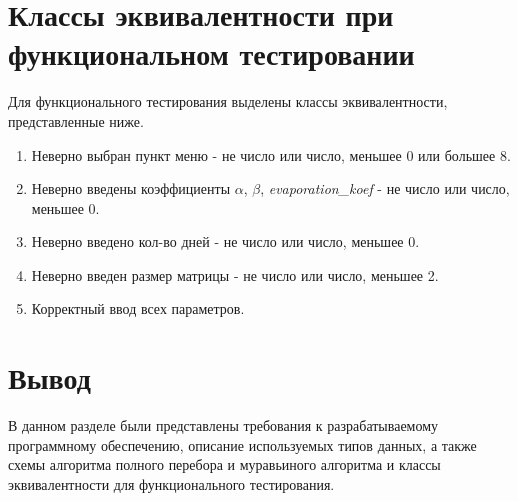 
\clearpage

\section{Классы эквивалентности при функциональном тестировании}

Для функционального тестирования выделены классы эквивалентности, представленные ниже.

\begin{enumerate}
	\item Неверно выбран пункт меню - не число или число, меньшее 0 или большее 8.
	\item Неверно введены коэффициенты $\alpha$, $\beta$, \textit{evaporation\_koef} - не число или число, меньшее 0.
	\item Неверно введено кол-во дней - не число или число, меньшее 0.
	\item Неверно введен размер матрицы - не число или число, меньшее 2.
	\item Корректный ввод всех параметров.
\end{enumerate}


\section*{Вывод}

В данном разделе были представлены требования к разрабатываемому программному обеспечению, описание используемых типов данных, а также схемы алгоритма полного перебора и муравьиного алгоритма и классы эквивалентности для функционального тестирования.


